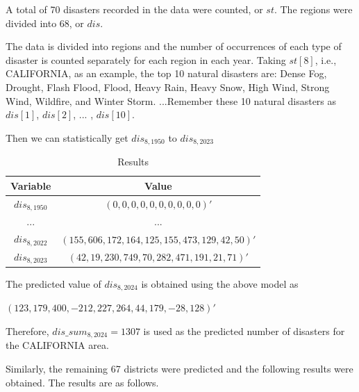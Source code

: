 \documentclass[12pt]{article}  %
\begin{document}
A total of 70 disasters recorded in the data were counted, or $st$. The regions were divided into 68, or $dis$.

The data is divided into regions and the number of occurrences of each type of disaster is counted separately for each region in each year. Taking $st[8]$, i.e., CALIFORNIA, as an example, the top 10 natural disasters are: Dense Fog, Drought, Flash Flood, Flood, Heavy Rain, Heavy Snow, High Wind, Strong Wind, Wildfire, and Winter Storm. ...Remember these 10 natural disasters as $dis[1]$, $dis[2]$, ... , $dis[10]$.

Then we can statistically get $dis_{8,1950}$ to $dis_{8,2023}$


\begin{table}[!ht]
    \centering
    \begin{tabular}{|c|c|}
    \hline
    Variable & Value\\ \hline
        $dis_{8,1950}$ & $(0,0,0,0,0,0,0,0,0,0)'$  \\ \hline
        ... & ...  \\ \hline
        $dis_{8,2022}$ & $(155,606,172,164,125,155,473,129,42,50)'$  \\ \hline
        $dis_{8,2023}$ & $(42,19,230,749,70,282,471,191,21,71)'$  \\ \hline
    \end{tabular}
    \caption{\label{demo-table}Results}
\end{table}

The predicted value of $dis_{8,2024}$ is obtained using the above model as

$(123,179,400,-212,227,264,44,179,-28,128)'$

Therefore, $dis\_sum_{8,2024}=1307$ is used as the predicted number of disasters for the CALIFORNIA area.

Similarly, the remaining 67 districts were predicted and the following results were obtained. The results are as follows.
\end{document}
